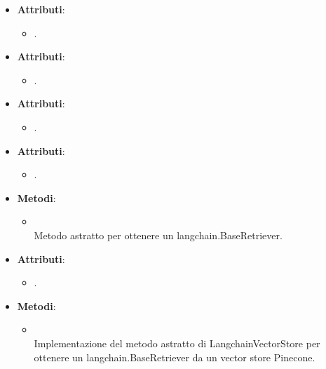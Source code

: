 \documentclass[10pt, a4paper]{article}
\begin{document}
\label{LangchainLLMDettaglio}
\begin{itemize}
    \item \textbf{Attributi}:
    \begin{itemize}
        \item {}.
    \end{itemize}
\end{itemize}

\label{OpenAILLMDettaglio}
\begin{itemize}
    \item \textbf{Attributi}:
    \begin{itemize}
        \item {}.
    \end{itemize}
\end{itemize}

\label{HugginFaceLLMDettaglio}
\begin{itemize}
    \item \textbf{Attributi}:
    \begin{itemize}
        \item {}.
    \end{itemize}
\end{itemize}

\label{LangchainVectorStoreDettaglio}
\begin{itemize}
    \item \textbf{Attributi}:
    \begin{itemize}
        \item {}.
    \end{itemize}
    \item \textbf{Metodi}:
    \begin{itemize}
        \item {}\\
        Metodo astratto per ottenere un langchain.BaseRetriever.
    \end{itemize}
\end{itemize}

\label{PineconeVectorStoreDettaglio}
\begin{itemize}
    \item \textbf{Attributi}:
    \begin{itemize}
        \item {}.
    \end{itemize}
    \item \textbf{Metodi}:
    \begin{itemize}
        \item {}\\
        Implementazione del metodo astratto di LangchainVectorStore per ottenere un langchain.BaseRetriever da un vector store Pinecone.
    \end{itemize}
\end{itemize}
\end{document}
